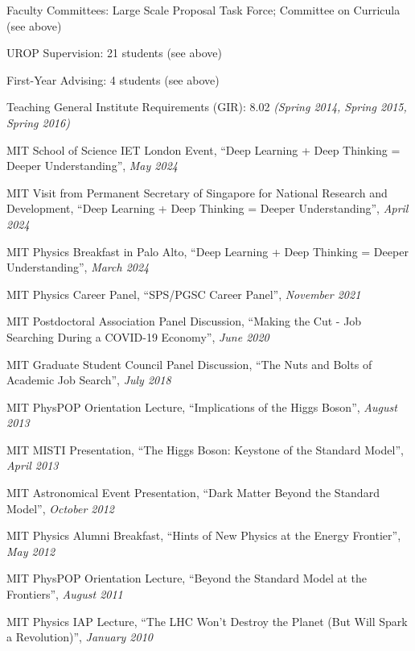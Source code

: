 \item Faculty Committees: Large Scale Proposal Task Force; Committee on Curricula (see above) 
\item UROP Supervision: 21 students (see above) 
\item First-Year Advising: 4 students (see above) 
\item Teaching General Institute Requirements (GIR):  8.02 \emph{(Spring 2014, Spring 2015, Spring 2016)}
\item MIT School of Science IET London Event, ``Deep Learning + Deep Thinking = Deeper Understanding'', \emph{May 2024}
\item MIT Visit from Permanent Secretary of Singapore for National Research and Development, ``Deep Learning + Deep Thinking = Deeper Understanding'', \emph{April 2024}
\item MIT Physics Breakfast in Palo Alto, ``Deep Learning + Deep Thinking = Deeper Understanding'', \emph{March 2024}
\item MIT Physics Career Panel, ``SPS/PGSC Career Panel'', \emph{November 2021}
\item MIT Postdoctoral Association Panel Discussion, ``Making the Cut - Job Searching During a COVID-19 Economy'', \emph{June 2020}
\item MIT Graduate Student Council Panel Discussion, ``The Nuts and Bolts of Academic Job Search'', \emph{July 2018}
\item MIT PhysPOP Orientation Lecture, ``Implications of the Higgs Boson'', \emph{August 2013}
\item MIT MISTI Presentation, ``The Higgs Boson: Keystone of the Standard Model'', \emph{April 2013}
\item MIT Astronomical Event Presentation, ``Dark Matter Beyond the Standard Model'', \emph{October 2012}
\item MIT Physics Alumni Breakfast, ``Hints of New Physics at the Energy Frontier'', \emph{May 2012}
\item MIT PhysPOP Orientation Lecture, ``Beyond the Standard Model at the Frontiers'', \emph{August 2011}
\item MIT Physics IAP Lecture, ``The LHC Won’t Destroy the Planet (But Will Spark a Revolution)'', \emph{January 2010}
